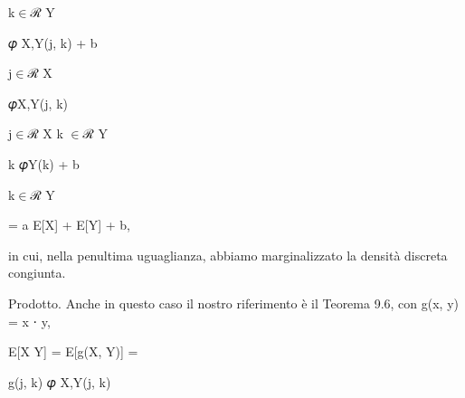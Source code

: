 \documentclass[a4paper,portrait,12pt]{article}
\begin{document}
\begin{flushleft}
k$\in$ℛ Y
\end{flushleft}





\begin{flushleft}
𝜑 X,Y(j, k) + b
\end{flushleft}


\begin{flushleft}
j$\in$ℛ X
\end{flushleft}





\begin{flushleft}
𝜑X,Y(j, k)
\end{flushleft}


\begin{flushleft}
j$\in$ℛ X k $\in$ℛ Y
\end{flushleft}





\begin{flushleft}
k 𝜑Y(k) + b
\end{flushleft}


\begin{flushleft}
k$\in$ℛ Y
\end{flushleft}





\begin{flushleft}
= a E[X] + E[Y] + b,
\end{flushleft}


\begin{flushleft}
in cui, nella penultima uguaglianza, abbiamo marginalizzato la densit\`{a} discreta congiunta.
\end{flushleft}


\begin{flushleft}
Prodotto. Anche in questo caso il nostro riferimento \`{e} il Teorema 9.6, con g(x, y) = x ⋅ y,
\end{flushleft}


\begin{flushleft}
E[X Y] = E[g(X, Y)] =
\end{flushleft}





\begin{flushleft}
g(j, k) 𝜑 X,Y(j, k)
\end{flushleft}
\end{document}
